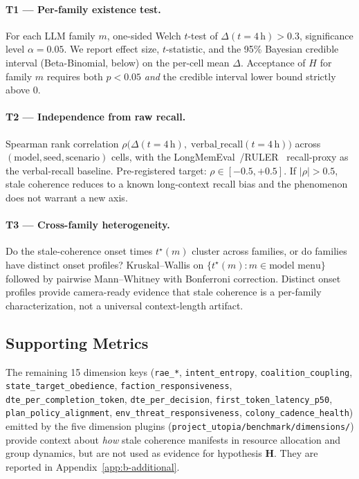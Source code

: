 \paragraph{T1 --- Per-family existence test.} For each LLM family
$m$, one-sided Welch $t$-test of $\Delta(t = 4\,\text{h}) > 0.3$,
significance level $\alpha = 0.05$. We report effect size,
$t$-statistic, and the 95\% Bayesian credible interval (Beta-Binomial,
below) on the per-cell mean $\Delta$. Acceptance of $H$ for family
$m$ requires both $p < 0.05$ \emph{and} the credible interval lower
bound strictly above 0.

\paragraph{T2 --- Independence from raw recall.} Spearman rank
correlation
$\rho\bigl(\Delta(t=4\,\text{h}),\;\text{verbal\_recall}(t=4\,\text{h})\bigr)$
across $(\text{model}, \text{seed}, \text{scenario})$ cells, with
the LongMemEval~\citep{Wu2025LongMemEval}/RULER~\citep{Hsieh2024RULER}
recall-proxy as the verbal-recall baseline. Pre-registered target:
$\rho \in [-0.5, +0.5]$. If $|\rho| > 0.5$, stale coherence reduces
to a known long-context recall bias and the phenomenon does not
warrant a new axis.

\paragraph{T3 --- Cross-family heterogeneity.} Do the
stale-coherence onset times $t^\star(m)$ cluster across families, or
do families have distinct onset profiles? Kruskal--Wallis on
$\{t^\star(m) : m \in \text{model menu}\}$ followed by pairwise
Mann--Whitney with Bonferroni correction. Distinct onset profiles
provide camera-ready evidence that stale coherence is a per-family
characterization, not a universal context-length artifact.

\subsection{Supporting Metrics}
\label{sec:supporting}

The remaining 15 dimension keys
(\texttt{rae\_*}, \texttt{intent\_entropy},
\texttt{coalition\_coupling}, \texttt{state\_target\_obedience},
\texttt{faction\_responsiveness}, \texttt{dte\_per\_completion\_token},
\texttt{dte\_per\_decision}, \texttt{first\_token\_latency\_p50},
\texttt{plan\_policy\_alignment},
\texttt{env\_threat\_responsiveness},
\texttt{colony\_cadence\_health}) emitted by the five dimension
plugins (\texttt{project\_utopia/benchmark/dimensions/}) provide
context about \emph{how} stale coherence manifests in resource
allocation and group dynamics, but are not used as evidence for
hypothesis $\mathbf{H}$. They are reported in
Appendix~\ref{app:b-additional}.

